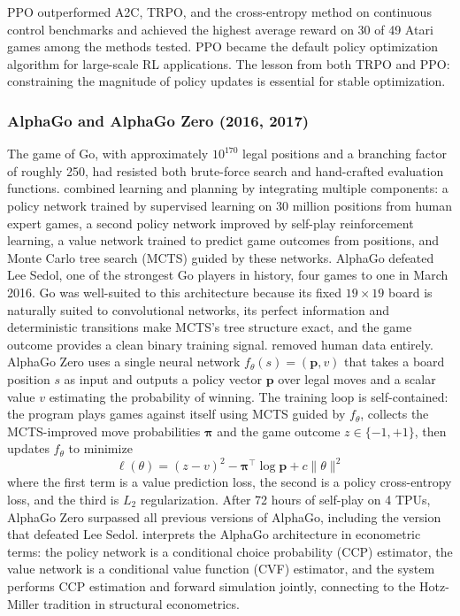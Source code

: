 PPO outperformed A2C, TRPO, and the cross-entropy method on continuous control benchmarks and achieved the highest average reward on 30 of 49 Atari games among the methods tested. PPO became the default policy optimization algorithm for large-scale RL applications. The lesson from both TRPO and PPO: constraining the magnitude of policy updates is essential for stable optimization.

\subsubsection{AlphaGo and AlphaGo Zero (2016, 2017)}

The game of Go, with approximately $10^{170}$ legal positions and a branching factor of roughly 250, had resisted both brute-force search and hand-crafted evaluation functions. \citet{Silver2016} combined learning and planning by integrating multiple components: a policy network trained by supervised learning on 30 million positions from human expert games, a second policy network improved by self-play reinforcement learning, a value network trained to predict game outcomes from positions, and Monte Carlo tree search (MCTS) guided by these networks. AlphaGo defeated Lee Sedol, one of the strongest Go players in history, four games to one in March 2016. Go was well-suited to this architecture because its fixed $19 \times 19$ board is naturally suited to convolutional networks, its perfect information and deterministic transitions make MCTS's tree structure exact, and the game outcome provides a clean binary training signal. \citet{Silver2017} removed human data entirely. AlphaGo Zero uses a single neural network $f_\theta(s) = (\mathbf{p}, v)$ that takes a board position $s$ as input and outputs a policy vector $\mathbf{p}$ over legal moves and a scalar value $v$ estimating the probability of winning. The training loop is self-contained: the program plays games against itself using MCTS guided by $f_\theta$, collects the MCTS-improved move probabilities $\boldsymbol{\pi}$ and the game outcome $z \in \{-1, +1\}$, then updates $f_\theta$ to minimize
\begin{equation}
\ell(\theta) = (z - v)^2 - \boldsymbol{\pi}^\top \log \mathbf{p} + c \|\theta\|^2
\end{equation}
where the first term is a value prediction loss, the second is a policy cross-entropy loss, and the third is $L_2$ regularization. After 72 hours of self-play on 4 TPUs, AlphaGo Zero surpassed all previous versions of AlphaGo, including the version that defeated Lee Sedol. \citet{Igami2020} interprets the AlphaGo architecture in econometric terms: the policy network is a conditional choice probability (CCP) estimator, the value network is a conditional value function (CVF) estimator, and the system performs CCP estimation and forward simulation jointly, connecting to the Hotz-Miller tradition in structural econometrics.

